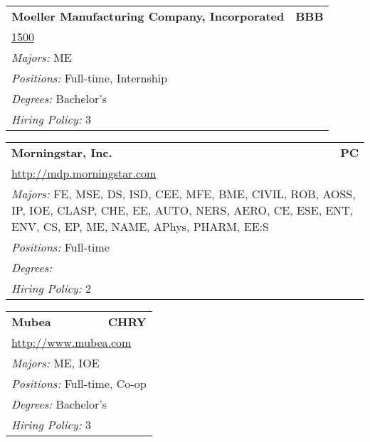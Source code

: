 \documentclass[twoside]{article}
\begin{document}
\begin{center}
\begin{multicols}{3}
\begin{FlushLeft}
\begin{minipage}{\columnwidth}
\end{minipage}
 
\begin{minipage}{\columnwidth}\begin{tabularx}{.95\columnwidth}{Xr}
                 {\Large\bf Moeller Manufacturing Company, Incorporated} & {\Large\bf BBB}\\
    \multicolumn{2}{p{.95\columnwidth}}{\url{1500}}\\
    \multicolumn{2}{p{.95\columnwidth}}{\emph{Majors:} ME}\\
    \multicolumn{2}{p{.95\columnwidth}}{\emph{Positions:} Full-time, Internship}\\
    \multicolumn{2}{p{.95\columnwidth}}{\emph{Degrees:} Bachelor's}\\
    \multicolumn{2}{p{.95\columnwidth}}{\emph{Hiring Policy:} 3}\\
    \end{tabularx}
    
\end{minipage}
 
\begin{minipage}{\columnwidth}\begin{tabularx}{.95\columnwidth}{Xr}
                 {\Large\bf Morningstar, Inc.} & {\Large\bf PC}\\
    \multicolumn{2}{p{.95\columnwidth}}{\url{http://mdp.morningstar.com}}\\
    \multicolumn{2}{p{.95\columnwidth}}{\emph{Majors:} FE, MSE, DS, ISD, CEE, MFE, BME, CIVIL, ROB, AOSS, IP, IOE, CLASP, CHE, EE, AUTO, NERS, AERO, CE, ESE, ENT, ENV, CS, EP, ME, NAME, APhys, PHARM, EE:S}\\
    \multicolumn{2}{p{.95\columnwidth}}{\emph{Positions:} Full-time}\\
    \multicolumn{2}{p{.95\columnwidth}}{\emph{Degrees:} }\\
    \multicolumn{2}{p{.95\columnwidth}}{\emph{Hiring Policy:} 2}\\
    \end{tabularx}
    
\end{minipage}
 
\begin{minipage}{\columnwidth}\begin{tabularx}{.95\columnwidth}{Xr}
                 {\Large\bf Mubea} & {\Large\bf CHRY}\\
    \multicolumn{2}{p{.95\columnwidth}}{\url{http://www.mubea.com}}\\
    \multicolumn{2}{p{.95\columnwidth}}{\emph{Majors:} ME, IOE}\\
    \multicolumn{2}{p{.95\columnwidth}}{\emph{Positions:} Full-time, Co-op}\\
    \multicolumn{2}{p{.95\columnwidth}}{\emph{Degrees:} Bachelor's}\\
    \multicolumn{2}{p{.95\columnwidth}}{\emph{Hiring Policy:} 3}\\
    \end{tabularx}
    

\end{minipage}
\end{FlushLeft}
\end{multicols}
\end{center}
\end{document}
